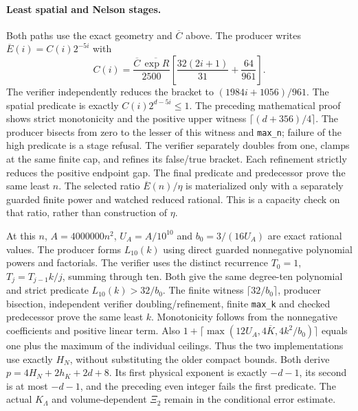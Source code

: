 \paragraph{Least spatial and Nelson stages.}
Both paths use the exact geometry and $\overline C$ above. The producer writes
$\overline E(i)=C(i)2^{-5i}$ with
\[
 C(i)=\frac{\overline C\,\overline{\exp R}}{2500}
 \left[\frac{32(2i+1)}{31}+\frac{64}{961}\right].
\]
The verifier independently reduces the bracket to $(1984i+1056)/961$.
The spatial predicate is exactly $C(i)2^{d-5i}\le1$. The preceding
mathematical proof shows strict monotonicity and the positive upper witness
$\lceil(d+356)/4\rceil$. The producer bisects from zero to the lesser of
this witness and \texttt{max\_n}; failure of the high predicate is a stage
refusal. The verifier separately doubles from one, clamps at the same finite
cap, and refines its false/true bracket. Each refinement strictly reduces
the positive endpoint gap. The final predicate and predecessor prove the
same least $n$. The selected ratio $\overline E(n)/\eta$ is materialized
only with a separately guarded finite power and watched reduced rational.
This is a capacity check on that ratio, rather than construction of $\eta$.

At this $n$, $A=4000000n^2$, $U_A=A/10^{10}$ and $b_0=3/(16U_A)$ are
exact rational values. The producer forms $L_{10}(k)$ using direct guarded
nonnegative polynomial powers and factorials. The verifier uses the distinct
recurrence $T_0=1$, $T_j=T_{j-1}k/j$, summing through ten. Both give the
same degree-ten polynomial and strict predicate $L_{10}(k)>32/b_0$.
The finite witness $\lceil32/b_0\rceil$, producer bisection, independent
verifier doubling/refinement, finite \texttt{max\_k} and checked predecessor
prove the same least $k$. Monotonicity follows from the nonnegative
coefficients and positive linear term. Also
$1+\lceil\max(12U_A,4\overline K,4k^2/b_0)\rceil$ equals one plus the
maximum of the individual ceilings. Thus the two implementations use exactly
$H_N$, without substituting the older compact bounds. Both derive
$p=4H_N+2h_K+2d+8$. Its first physical exponent is exactly $-d-1$, its
second is at most $-d-1$, and the preceding even integer fails the first
predicate. The actual $K_\Lambda$ and volume-dependent $\Xi_2$ remain in
the conditional error estimate.

